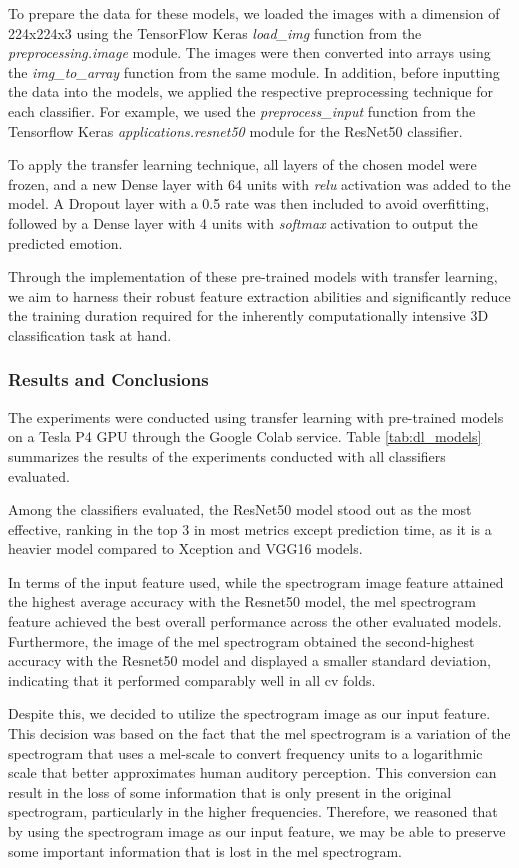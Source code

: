 To prepare the data for these models, we loaded the images with a dimension of 224x224x3 using the TensorFlow Keras \textit{load\_img} function from the \textit{preprocessing.image} module. The images were then converted into arrays using the \textit{img\_to\_array} function from the same module. In addition, before inputting the data into the models, we applied the respective preprocessing technique for each classifier. For example, we used the \textit{preprocess\_input} function from the Tensorflow  Keras \textit{applications.resnet50} module for the ResNet50 classifier.

To apply the transfer learning technique, all layers of the chosen model were frozen, and a new Dense layer with 64 units with \textit{relu} activation was added to the model. A Dropout layer with a 0.5 rate was then included to avoid overfitting, followed by a Dense layer with 4 units with \textit{softmax} activation to output the predicted emotion.

Through the implementation of these pre-trained models with transfer learning, we aim to harness their robust feature extraction abilities and significantly reduce the training duration required for the inherently computationally intensive 3D classification task at hand.


\subsubsection{Results and Conclusions}

The experiments were conducted using transfer learning with pre-trained models on a Tesla P4 GPU through the Google Colab service. Table \ref{tab:dl_models} summarizes the results of the experiments conducted with all classifiers evaluated.

Among the classifiers evaluated, the ResNet50 model stood out as the most effective, ranking in the top 3 in most metrics except prediction time, as it is a heavier model compared to Xception and VGG16 models.

In terms of the input feature used, while the spectrogram image feature attained the highest average accuracy with the Resnet50 model, the mel spectrogram feature achieved the best overall performance across the other evaluated models. Furthermore, the image of the mel spectrogram obtained the second-highest accuracy with the Resnet50 model and displayed a smaller standard deviation, indicating that it performed comparably well in all \ac{cv} folds.

Despite this, we decided to utilize the spectrogram image as our input feature. This decision was based on the fact that the mel spectrogram is a variation of the spectrogram that uses a mel-scale to convert frequency units to a logarithmic scale that better approximates human auditory perception. This conversion can result in the loss of some information that is only present in the original spectrogram, particularly in the higher frequencies. Therefore, we reasoned that by using the spectrogram image as our input feature, we may be able to preserve some important information that is lost in the mel spectrogram.


